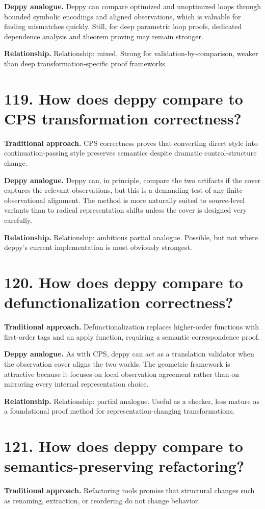 \documentclass[11pt,openany]{book}
\begin{document}
\textbf{Deppy analogue.} Deppy can compare optimized and unoptimized loops through bounded symbolic encodings and aligned observations, which is valuable for finding mismatches quickly. Still, for deep parametric loop proofs, dedicated dependence analysis and theorem proving may remain stronger.

\textbf{Relationship.} Relationship: mixed. Strong for validation-by-comparison, weaker than deep transformation-specific proof frameworks.

\section*{119. How does deppy compare to CPS transformation correctness?}
\textbf{Traditional approach.} CPS correctness proves that converting direct style into continuation-passing style preserves semantics despite dramatic control-structure change.

\textbf{Deppy analogue.} Deppy can, in principle, compare the two artifacts if the cover captures the relevant observations, but this is a demanding test of any finite observational alignment. The method is more naturally suited to source-level variants than to radical representation shifts unless the cover is designed very carefully.

\textbf{Relationship.} Relationship: ambitious partial analogue. Possible, but not where deppy's current implementation is most obviously strongest.

\section*{120. How does deppy compare to defunctionalization correctness?}
\textbf{Traditional approach.} Defunctionalization replaces higher-order functions with first-order tags and an apply function, requiring a semantic correspondence proof.

\textbf{Deppy analogue.} As with CPS, deppy can act as a translation validator when the observation cover aligns the two worlds. The geometric framework is attractive because it focuses on local observation agreement rather than on mirroring every internal representation choice.

\textbf{Relationship.} Relationship: partial analogue. Useful as a checker, less mature as a foundational proof method for representation-changing transformations.

\section*{121. How does deppy compare to semantics-preserving refactoring?}
\textbf{Traditional approach.} Refactoring tools promise that structural changes such as renaming, extraction, or reordering do not change behavior.
\end{document}
